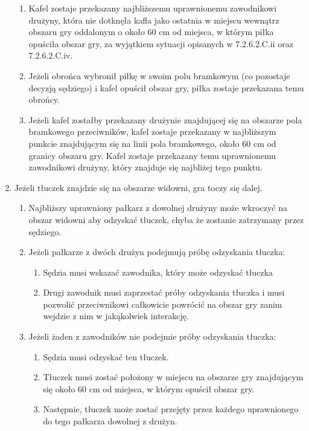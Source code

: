 \documentclass[12pt]{article}
\begin{document}
\begin{enumerate}
  \begin{enumerate}
  \item
        Kafel zostaje przekazany najbliższemu uprawnionemu zawodnikowi
    drużyny, która nie dotknęła kafla jako ostatnia w miejscu wewnątrz
    obszaru gry oddalonym o około 60 cm od miejsca, w którym piłka
    opuściła obszar gry, za wyjątkiem sytuacji opisanych w 7.2.6.2.C.ii
    oraz 7.2.6.2.C.iv.
      \item
        Jeżeli obrońca wybronił piłkę w swoim polu bramkowym (co pozostaje
    decyzją sędziego) i kafel opuścił obszar gry, piłka zostaje
    przekazana temu obrońcy.
      \item
        Jeżeli kafel zostałby przekazany drużynie znajdującej się na
    obszarze pola bramkowego przeciwników, kafel zostaje przekazany w
    najbliższym punkcie znajdującym się na linii pola bramkowego, około
    60 cm od granicy obszaru gry. Kafel zostaje przekazany temu
    uprawnionemu zawodnikowi drużyny, który znajduje się najbliżej tego
    punktu.
      \end{enumerate}
\item
    Jeżeli tłuczek znajdzie się na obszarze widowni, gra toczy się dalej.
  
  \begin{enumerate}
  \item
        Najbliższy uprawniony pałkarz z dowolnej drużyny może wkroczyć na
    obszar widowni aby odzyskać tłuczek, chyba że zostanie zatrzymany
    przez sędziego.
      \item
        Jeżeli pałkarze z dwóch drużyn podejmują próbę odzyskania tłuczka:
    
    \begin{enumerate}
    \item
            Sędzia musi wskazać zawodnika, który może odzyskać tłuczka
          \item
            Drugi zawodnik musi zaprzestać próby odzyskania tłuczka i musi
      pozwolić przeciwnikowi całkowicie powrócić na obszar gry zanim
      wejdzie z nim w jakąkolwiek interakcję.
          \end{enumerate}
  \item
        Jeżeli żaden z zawodników nie podejmie próby odzyskania tłuczka:
    
    \begin{enumerate}
    \item
            Sędzia musi odzyskać ten tłuczek.
          \item
            Tłuczek musi zostać położony w miejscu na obszarze gry znajdującym
      się około 60 cm od miejsca, w którym opuścił obszar gry.
          \item
            Następnie, tłuczek może zostać przejęty przez każdego uprawnionego
      do tego pałkarza dowolnej z drużyn.
          \end{enumerate}
  \end{enumerate}
\end{enumerate}
\end{document}
